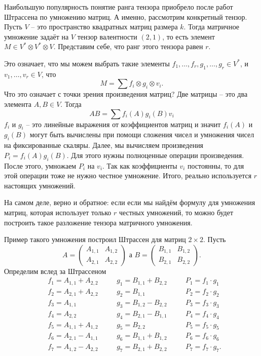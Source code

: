 \documentclass[10pt,a4paper,oneside]{book}
\theoremstyle{definition}
\def\pmat{\begin{pmatrix}}
\def\epmat{\end{pmatrix}}
\begin{document}
Наибольшую популярность понятие ранга тензора приобрело после работ Штрассена по умножению матриц. А именно, рассмотрим конкретный тензор. Пусть $V$ -- это пространство квадратных матриц размера $k$. Тогда матричное умножение задаёт на $V$ тензор валентности $(2,1)$, то есть элемент $M\in V^*\otimes V^* \otimes V$. Представим себе, что ранг этого тензора равен $r$.

Это означает, что мы можем выбрать такие элементы $f_1,\dots,f_r, g_1, \dots, g_r \in V^*$, и $v_1,\dots,v_r \in V$, что
$$M= \sum f_i\otimes g_i \otimes v_i.$$
Что это означает с точки зрения произведения матриц? Две матрицы -- это два элемента $A,B \in V$. Тогда 
$$AB=\sum f_i(A)g_i(B)v_i$$
$f_i$ и $g_i$ -- это линейные выражения от коэффициентов матриц и значит  $f_i(A)$ и $g_i(B)$ могут быть вычислены при помощи сложения чисел и умножения чисел на фиксированные скаляры. Далее, мы вычисляем произведения $P_i=f_i(A)g_i(B)$. Для этого нужны полноценные операции произведения. После этого, умножаем $P_i$ на $v_i$. Так как коэффициенты $v_i$ постоянны, то для этой операции тоже не нужно честное умножение. Итого, реально используется $r$ настоящих умножений. 

На самом деле, верно и обратное: если если мы найдём формулу для умножения матриц, которая использует только $r$ честных умножений, то можно будет построить такое разложение тензора матричного умножения. 

Пример такого умножения построил Штрассен для матриц $2\times 2$. Пусть 
$$A=\pmat A_{1,1} & A_{1,2} \\ A_{2,1} & A_{2,2} \epmat \text{ а } B=\pmat B_{1,1} & B_{1,2} \\ B_{2,1} & B_{2,2} \epmat.$$
Определим вслед за Штрассеном
$$
\begin{aligned}
&f_1=A_{1,1}+ A_{2,2} &\quad & g_1= B_{1,1}+B_{2,2} &\quad & P_1=f_1\cdot g_1\\
&f_2=A_{2,1}+A_{2,2} &\quad & g_2=B_{1,1}&\quad & P_2=f_2\cdot g_2\\
&f_3=A_{1,1}&\quad & g_3=B_{1,2}-B_{2,2}  &\quad & P_3=f_3\cdot g_3\\
&f_4=A_{2,2}&\quad & g_4=B_{2,1}-B_{1,1} &\quad & P_4=f_4\cdot g_4\\
&f_5=A_{1,1}+A_{1,2}&\quad & g_5=B_{2,2} &\quad & P_5=f_5\cdot g_5\\
&f_6=A_{2,1}-A_{1,1}&\quad & g_6=B_{1,1}+B_{1,2} &\quad & P_6=f_6\cdot g_6\\
&f_7=A_{1,2}-A_{2,2}&\quad & g_7=B_{2,1}+B_{2,2} &\quad & P_7=f_7\cdot g_7.
\end{aligned}
$$
\end{document}

